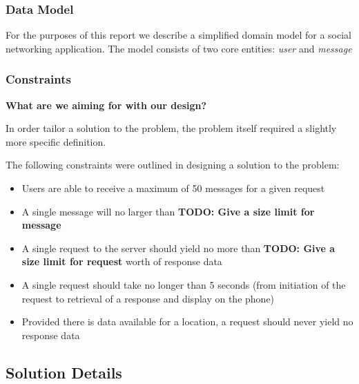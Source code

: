 \documentclass{article}
\begin{document}
\subsubsection{Data Model} %
\label{ssub:data_model}

For the purposes of this report we describe a simplified domain model for a social networking application. The model consists of two core entities: \emph{user} and \emph{message}


\subsubsection{Constraints} %
\label{ssub:constraints}

\textbf{What are we aiming for with our design?}

In order tailor a solution to the problem, the problem itself required a slightly more specific definition.

The following constraints were outlined in designing a solution to the problem:

\begin{itemize}

	\item Users are able to receive a maximum of 50 messages for a given request
	\item A single message will no larger than \textbf{TODO: Give a size limit for message}
	\item A single request to the server should yield no more than \textbf{TODO: Give a size limit for request} worth of response data
	\item A single request should take no longer than 5 seconds (from initiation of the request to retrieval of a response and display on the phone)
	\item Provided there is data available for a location, a request should never yield no response data
\end{itemize}



\subsection{Solution Details} %
\label{sub:solution_details}

\end{document}
